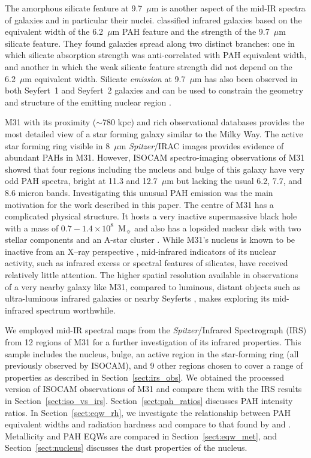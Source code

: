 The amorphous silicate feature at 9.7~$\mu$m is another aspect of the mid-IR spectra of galaxies and in particular their nuclei.  \citet{Spoon2007} 
classified infrared galaxies based on the equivalent width of the 6.2~$\mu$m PAH feature and the strength of the 9.7~$\mu$m silicate feature. 
They  found galaxies spread along two distinct branches: one in which silicate absorption strength was anti-correlated with PAH
equivalent width, and another in which the weak silicate feature strength did not depend on the 6.2~$\mu$m equivalent width.
Silicate {\em emission} at 9.7~$\mu$m has also been observed in both Seyfert~1 and Seyfert~2 galaxies 
and can be used to constrain the geometry and structure of the emitting nuclear region \citep{Mason2009}.



M31 with its proximity ($\sim$780 kpc) and rich observational databases provides the most detailed view of a star forming galaxy similar 
to the Milky Way. The active star forming ring visible in 8~$\mu$m  {\em Spitzer}/IRAC images \citep{Barmby2006lr} provides evidence of abundant PAHs in M31. 
However, ISOCAM spectro-imaging observations of M31\citep{1998Cesarsky} showed that four regions including the nucleus and bulge 
of this galaxy have very odd PAH spectra, bright at 11.3 and 12.7~$\mu$m but lacking the usual 6.2, 7.7, and 8.6 micron bands. 
Investigating this unusual PAH emission was the main motivation for the work described in this paper. 
The centre of M31 has a complicated physical structure. It hosts a very inactive supermassive black hole with a mass of 
$0.7-1.4 \times 10^8$~M$_{\sun}$ \citep{Bacon2001, Bender2005} and also has a lopsided nuclear disk  with two stellar 
components and an A-star cluster \citep{Lauer1993}. While M31's nucleus is known to be inactive from an 
X--ray perspective \citep{Li2011}, mid-infrared indicators of its nuclear activity, such
as infrared excess or spectral features of silicates,  have received relatively little attention. 
The higher spatial resolution available in observations of  a very nearby galaxy like M31, compared to 
luminous, distant objects such as ultra-luminous infrared galaxies \citep{Spoon2007} or nearby Seyferts \citep{Mason2009},
makes exploring its mid-infrared spectrum worthwhile.


We employed mid-IR spectral maps from the {\em Spitzer}/Infrared Spectrograph (IRS) from 12 regions of M31 for a further investigation of 
its infrared properties. This sample includes the nucleus, bulge, an active region in the star-forming ring (all previously observed by ISOCAM), and 9 
other regions chosen to cover a range of properties as described in Section~\ref{sect:irs_obs}. 
We obtained the processed version of ISOCAM observations of M31 and compare them with the IRS results in Section~\ref{sect:iso_vs_irs}. 
Section~\ref{sect:pah_ratios} discusses PAH intensity ratios.
In Section~\ref{sect:eqw_rh}, we investigate the relationship between PAH equivalent widths and radiation 
hardness and compare to that found by \citet{Engelbracht_2008} and \citet{Gordon:2008lr}. Metallicity and PAH EQWs are compared in 
Section~\ref{sect:eqw_met}, and Section~\ref{sect:nucleus} discusses the dust properties of the nucleus. 	
